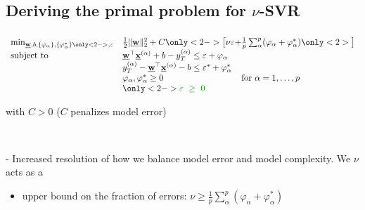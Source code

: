 \subsection{Deriving the primal problem for $\nu$-SVR}

\begin{frame}\frametitle{\subsecname}

\slidesonly{\vspace{-4mm}}

\begin{block}{}
     \begin{equation}
        \begin{array}{ll}
        \min_{\vec w, b,\{\varphi_\alpha\}, \{\varphi_\alpha^*\}\only<2->{, {\color{darkgreen}{\varepsilon}}}} & \frac{1}{2} \lVert \vec w \rVert_{2}^{2} + C \only<2->{\big\lbrack \nu{\color{darkgreen}\varepsilon} + } \frac{1}{p} \sum_{\alpha}^p (\varphi_\alpha + \varphi_\alpha^*) \only<2>{\big\rbrack}\\
        \text{subject to} & 
        \vec w^{\top} \vec x^{(\alpha)} + b - y_{T}^{(\alpha)} \le \varepsilon + \varphi_\alpha\\
        &
        y_{T}^{(\alpha)} - \vec w^{\top} \vec x^{(\alpha)} - b \le \varepsilon^* + \varphi_\alpha^*\\
        &\varphi_\alpha, \varphi_\alpha^* \ge 0  \qquad\qquad\qquad\qquad\quad \text{for }\alpha=1,\ldots,p \\
        &\only<2->{{\color{darkgreen}\varepsilon~\ge~0}}
        \end{array}
        \label{eq:primalnu}
     \end{equation}
     
     \slidesonly{\vspace{-3mm}}
        with $C>0$ ($C$ penalizes model error)
\end{block}

\pause


     \slidesonly{\vspace{-3mm}}

     \\
     
\pause

     - Increased resolution of how we balance model error and model complexity. We %
     $\nu$ acts as a
     \begin{itemize}
     \item upper bound on the fraction of errors: $\nu \ge \frac{1}{p} \sum_{\alpha}^p (\varphi_\alpha + \varphi_\alpha^*)$
     

\end{itemize}
\end{frame}
